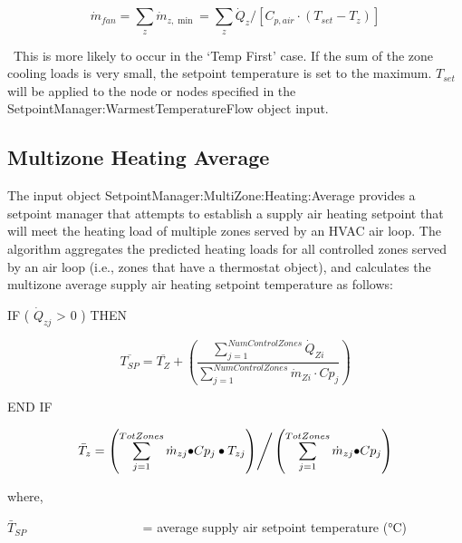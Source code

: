 \begin{equation}
{\dot m_{fan}} = \sum\limits_z {{{\dot m}_{z,\min }}}  = \sum\limits_z {{{\dot Q}_z}/[{C_{p,air}} \cdot ({T_{set}} - {T_z})]}
\end{equation}

~This is more likely to occur in the `Temp First' case. If the sum of the zone cooling loads is very small, the setpoint temperature is set to the maximum. \({T_{set}}\) will be applied to the node or nodes specified in the SetpointManager:WarmestTemperatureFlow object input.

\subsection{Multizone Heating Average}\label{multizone-heating-average}

The input object SetpointManager:MultiZone:Heating:Average provides a setpoint manager that attempts to establish a supply air heating setpoint that will meet the heating load of multiple zones served by an HVAC air loop. The algorithm aggregates the predicted heating loads for all controlled zones served by an air loop (i.e., zones that have a thermostat object), and calculates the multizone average supply air heating setpoint temperature as follows:

IF ( \({\dot Q_{zj}}\) \textgreater{} 0 ) THEN

\begin{equation}
\overline {{T_{SP}}}  = \overline {{T_Z}}  + \left( {\frac{{\sum\limits_{j = 1}^{NumControlZones} {{{\dot Q}_{Zi}}} }}{{\sum\limits_{j = 1}^{NumControlZones} {{{\dot m}_{Zi}}\cdot C{p_j}} }}} \right)
\end{equation}

END IF

\begin{equation}
{\bar T_z} = {{\left( {\sum\limits_{j = 1}^{TotZones} {{{\dot m}_{zj}} \bullet } C{p_j} \bullet {T_{zj}}} \right)} \mathord{\left/ {\vphantom {{\left( {\sum\limits_{j = 1}^{TotZones} {{{\dot m}_{zj}} \bullet } C{p_j} \bullet {T_{zj}}} \right)} {\left( {\sum\limits_{j = 1}^{TotZones} {{{\dot m}_{zj}} \bullet } C{p_j}} \right)}}} \right. } {\left( {\sum\limits_{j = 1}^{TotZones} {{{\dot m}_{zj}} \bullet } C{p_j}} \right)}}
\end{equation}

where,

\({\bar T_{SP}}\) ~~~~~~~~~~~~~~~~~ = average supply air setpoint temperature (°C)

